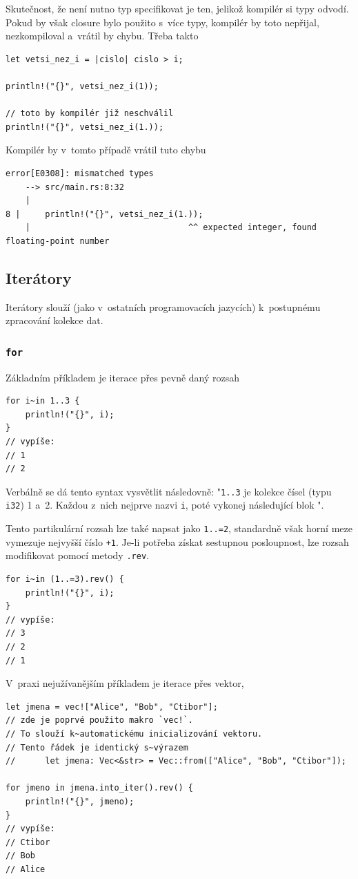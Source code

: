 \documentclass[a4paper, 12pt, twoside]{article} %
\newcommand{\rust}[1]{\texttt{#1}}
\begin{document}
			Skutečnost, že není nutno typ specifikovat je ten, jelikož kompilér si typy odvodí. Pokud by však closure bylo použito s~více typy, kompilér by toto nepřijal, nezkompiloval a~vrátil by chybu. Třeba takto
			\begin{verbatim}
let vetsi_nez_i = |cislo| cislo > i;

println!("{}", vetsi_nez_i(1));

// toto by kompilér již neschválil
println!("{}", vetsi_nez_i(1.));
			\end{verbatim}
			
			Kompilér by v~tomto případě vrátil tuto chybu
			\begin{verbatim}
error[E0308]: mismatched types
	--> src/main.rs:8:32
	|
8 |     println!("{}", vetsi_nez_i(1.));
	|                                ^^ expected integer, found floating-point number
			\end{verbatim}


	\subsection{Iterátory}
		Iterátory slouží (jako v~ostatních programovacích jazycích) k~postupnému zpracování kolekce dat. 


		\subsubsection*{\rust{for}}
			Základním příkladem je iterace přes pevně daný rozsah
			\begin{verbatim}
for i~in 1..3 {
	println!("{}", i);
}
// vypíše:
// 1
// 2
			\end{verbatim}

			Verbálně se dá tento syntax vysvětlit následovně: "\texttt{1..3} je kolekce čísel (typu \texttt{i32}) 1 a~2. Každou z~nich nejprve nazvi \texttt{i}, poté vykonej následující blok \texttt{\string{\dots\string}}".
			
			Tento partikulární rozsah lze také napsat jako \texttt{1..=2}, standardně však horní meze vymezuje nejvyšší číslo \texttt{+1}. Je-li potřeba získat sestupnou posloupnost, lze rozsah modifikovat pomocí metody \texttt{.rev}.
			\begin{verbatim}
for i~in (1..=3).rev() {
	println!("{}", i);
}
// vypíše:
// 3
// 2
// 1
			\end{verbatim}
			
			V~praxi nejužívanějším příkladem je iterace přes vektor,
			\begin{verbatim}
let jmena = vec!["Alice", "Bob", "Ctibor"];
// zde je poprvé použito makro `vec!`.
// To slouží k~automatickému inicializování vektoru.
// Tento řádek je identický s~výrazem
//      let jmena: Vec<&str> = Vec::from(["Alice", "Bob", "Ctibor"]);

for jmeno in jmena.into_iter().rev() {
	println!("{}", jmeno);
}
// vypíše:
// Ctibor
// Bob
// Alice
			\end{verbatim}
			
\end{document}
